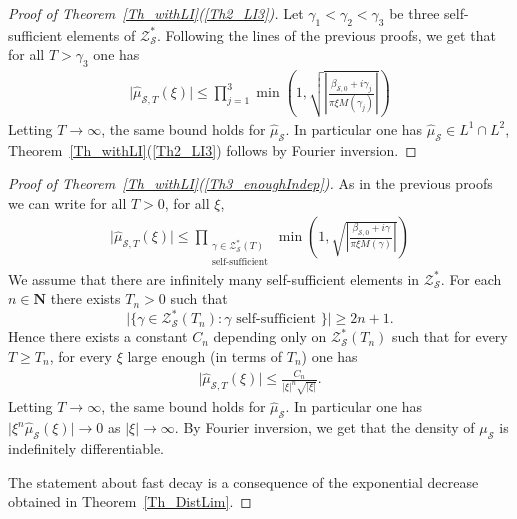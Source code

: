 \documentclass[a4paper,10pt]{amsart}
\theoremstyle{plain}
\theoremstyle{definition}
\begin{document}
\begin{proof}[Proof of Theorem~\ref{Th_withLI}(\ref{Th2_LI3})]
Let $\gamma_{1} <\gamma_{2} <\gamma_{3}$ be three self-sufficient elements of $\mathcal{Z}^{*}_{\mathcal{S}}$.
Following the lines of the previous proofs, we get that for all $T> \gamma_{3}$ one has 
\begin{align*}
\lvert \hat{\mu}_{\mathcal{S},T}(\xi)\rvert 
\leq \prod_{j=1}^{3}\min\left( 1, \sqrt{\left\lvert\frac{\beta_{\mathcal{S},0} + i\gamma_{j}}{ \pi\xi M(\gamma_{j})}\right\rvert}  \right)
\end{align*}
Letting $T\rightarrow\infty$, the same bound holds for $\hat{\mu}_{\mathcal{S}}$.
In particular one has $\hat{\mu}_{\mathcal{S}}\in L^{1}\cap L^{2}$,
Theorem~\ref{Th_withLI}(\ref{Th2_LI3}) follows by Fourier inversion.
\end{proof}

\begin{proof}[Proof of Theorem~\ref{Th_withLI}(\ref{Th3_enoughIndep})]
As in the previous proofs we can write for all $T>0$, for all $\xi$,
\begin{align*}
\lvert \hat{\mu}_{\mathcal{S},T}(\xi) \rvert \leq \prod_{\substack{\gamma \in \mathcal{Z}^{*}_{\mathcal{S}}(T) \\ \text{self-sufficient}}} \min\left( 1, \sqrt{\left\lvert\frac{\beta_{\mathcal{S},0} + i\gamma}{ \pi\xi M(\gamma)}\right\rvert}  \right)
\end{align*}
We assume that there are infinitely many self-sufficient elements in $\mathcal{Z}^{*}_{\mathcal{S}}$.
For each $n \in \mathbf{N}$ there exists $T_{n} >0$ such that
$$\lvert \lbrace \gamma \in \mathcal{Z}^{*}_{\mathcal{S}}(T_{n}) : \gamma \text{ self-sufficient }\rbrace\rvert \geq 2n +1.$$
Hence there exists a constant $C_{n}$ depending only on $\mathcal{Z}^{*}_{\mathcal{S}}(T_{n})$ such that for every $T\geq T_{n}$, for every $\xi$ large enough (in terms of $T_{n}$) one has
\begin{align*}
\lvert \hat{\mu}_{\mathcal{S},T}(\xi) \rvert \leq \frac{C_{n}}{\lvert\xi\rvert^{n}\sqrt{\lvert \xi\rvert}}.
\end{align*}
Letting $T\rightarrow\infty$, the same bound holds for $\hat{\mu}_{\mathcal{S}}$.
In particular one has $\lvert \xi^{n}\hat{\mu}_{\mathcal{S}}(\xi)\rvert \rightarrow 0$ as $\lvert \xi\rvert \rightarrow \infty$.
By Fourier inversion, we get that the density of $\mu_{\mathcal{S}}$ is indefinitely differentiable.

The statement about fast decay is a consequence of the exponential decrease obtained in Theorem~\ref{Th_DistLim}.
\end{proof}
\end{document}
